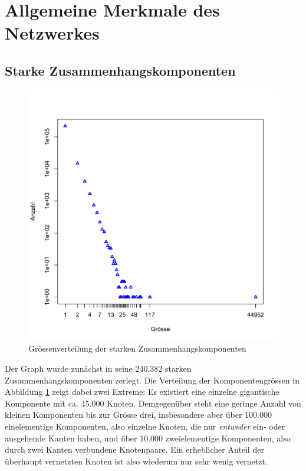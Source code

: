 \section{Allgemeine Merkmale des Netzwerkes}
\label{sec:result-allg-merkm-des}

\subsection{Starke Zusammenhangskomponenten}
\label{sec:result-komponentenstruktur}

\begin{figure}[t]
  \centering
  \includegraphics[scale=0.42]{images/component-size.pdf}
  \caption{Gr\"ossenverteilung der starken Zusammenhangskomponenten}
  \label{fig:component-size}
\end{figure}

Der Graph wurde zun\"achst in seine 240.382 starken
Zusammenhangskomponenten zerlegt. Die Verteilung der
Komponentengr\"ossen in Abbildung \ref{fig:component-size} zeigt dabei
zwei Extreme: Es existiert eine einzelne gigantische Komponente mit
ca. 45.000 Knoten. Demgegen\"uber steht eine geringe Anzahl von kleinen
Komponenten bis zur Gr\"osse drei, insbesondere aber \"uber 100.000
einelementige Komponenten, also einzelne Knoten, die nur
\emph{entweder} ein- oder ausgehende Kanten haben, und \"uber 10.000
zweielementige Komponenten, also durch zwei Kanten verbundene
Knotenpaare. Ein erheblicher Anteil der \"uberhaupt vernetzten Knoten
ist also wiederum nur sehr wenig vernetzt.

